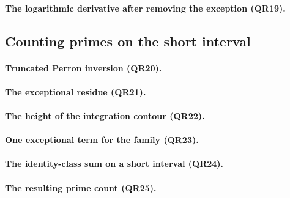 

\paragraph{The logarithmic derivative after removing the exception (QR19).}



\subsection{Counting primes on the short interval}

\paragraph{Truncated Perron inversion (QR20).}



\paragraph{The exceptional residue (QR21).}



\paragraph{The height of the integration contour (QR22).}



\paragraph{One exceptional term for the family (QR23).}



\paragraph{The identity-class sum on a short interval (QR24).}



\paragraph{The resulting prime count (QR25).}


